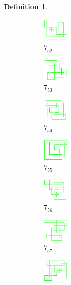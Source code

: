 \documentclass{article}
\theoremstyle{definition}
\newtheorem{defn}[thm]{Definition}
\theoremstyle{theorem}
\theoremstyle{proposition}
\theoremstyle{corollary}
\begin{document}
\begin{defn}
\begin{figure}[H]
\begin{subfigure}{0.075\textwidth}
    \includegraphics[width=1.25cm]{../Midterm_Poster/grid_diagram/theta_7_52.png}
    \caption{$7_{52}$} 
    \end{subfigure}
    \begin{subfigure}{0.075\textwidth}
    \includegraphics[width=1.25cm]{../Midterm_Poster/grid_diagram/theta_7_53.png}
    \caption{$7_{53}$} 
    \end{subfigure}
    \begin{subfigure}{0.075\textwidth}
    \includegraphics[width=1.25cm]{../Midterm_Poster/grid_diagram/theta_7_54.png}
    \caption{$7_{54}$} 
    \end{subfigure}
    \begin{subfigure}{0.075\textwidth}
    \includegraphics[width=1.25cm]{../Midterm_Poster/grid_diagram/theta_7_55.png}
    \caption{$7_{55}$} 
    \end{subfigure}
    \begin{subfigure}{0.075\textwidth}
    \includegraphics[width=1.25cm]{../Midterm_Poster/grid_diagram/theta_7_56.png}
    \caption{$7_{56}$} 
    \end{subfigure}
    \begin{subfigure}{0.075\textwidth}
    \includegraphics[width=1.25cm]{../Midterm_Poster/grid_diagram/theta_7_57.png}
    \caption{$7_{57}$} 
    \end{subfigure}
    \begin{subfigure}{0.075\textwidth}
    \includegraphics[width=1.25cm]{../Midterm_Poster/grid_diagram/theta_7_58.png}

\end{subfigure}
\end{figure}
\end{defn}
\end{document}
